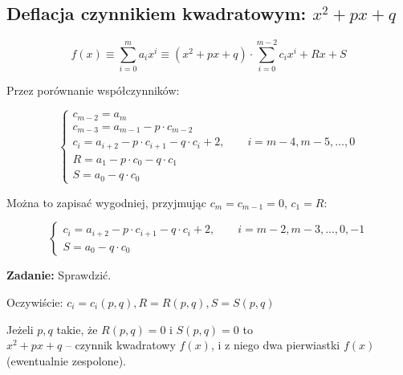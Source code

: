\subsection{Deflacja czynnikiem kwadratowym: $ x^2 +px + q $}

\begin{frame}
  $$ f(x) \equiv \sum_{i=0}^m a_i x^i \equiv (x^2 + px + q) \cdot \sum_{i=0}^{m-2} c_i x^i + Rx +S $$

  Przez porównanie współczynników:

  $$ \left \{ \begin{array}{l}
  c_{m-2} = a_m \\
  c_{m-3} = a_{m-1} - p \cdot c_{m-2} \\
  c_i = a_{i+2} - p \cdot c_{i+1} - q \cdot c_i + 2, \qquad i = m - 4, m - 5, \dots , 0 \\ %
  R = a_1 - p \cdot c_0 - q \cdot c_1 \\
  S = a_0 - q \cdot c_0
  \end{array} \right. $$

  Można to zapisać wygodniej, przyjmując $ c_m = c_{m-1} = 0 $, $ c_1 = R $:

  $$ \left \{ \begin{array}{l}
  c_i = a_{i+2} - p \cdot c_{i+1} - q \cdot c_i + 2, \qquad i = m-2, m-3, \dots , 0, -1 \\
  S = a_0 - q \cdot c_0
  \end{array} \right. $$

  \textbf{Zadanie:} Sprawdzić.
\end{frame}

\begin{frame}
  Oczywiście: $ c_i = c_i(p,q), R = R(p,q), S = S(p,q) $

  \vspace{5px}

  Jeżeli $p,q$ takie, że $R(p,q) = 0$ i $S(p,q) = 0$ to \\ $x^2 + px + q$ -- czynnik kwadratowy $f(x)$, i z niego dwa pierwiastki $f(x)$ (ewentualnie zespolone).
\end{frame}
